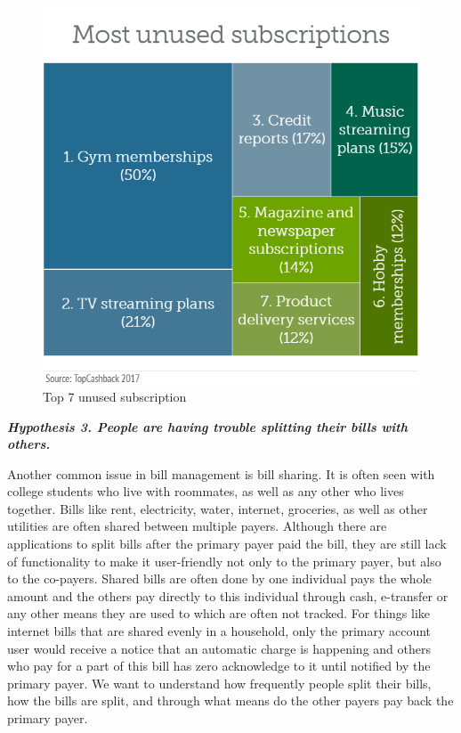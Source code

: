 \documentclass{sigchi}
\begin{document}
\begin{figure}[h!]
\centering
  \includegraphics[width=0.9\columnwidth]{unused-sub.png}
  \caption{Top 7 unused subscription }
  \label{fig:figure6}
\end{figure}

\textbf{\textit{Hypothesis 3. People are having trouble splitting their bills with others.}}

Another common issue in bill management is bill sharing. It is often seen with college students who live with roommates, as well as any other who lives together. Bills like rent, electricity, water, internet, groceries, as well as other utilities are often shared between multiple payers. Although there are applications to split bills after the primary payer paid the bill, they are still lack of functionality to make it user-friendly not only to the primary payer, but also to the co-payers. Shared bills are often done by one individual pays the whole amount and the others pay directly to this individual through cash, e-transfer or any other means they are used to which are often not tracked. For things like internet bills that are shared evenly in a household, only the primary account user would receive a notice that an automatic charge is happening and others who pay for a part of this bill has zero acknowledge to it until notified by the primary payer. We want to understand how frequently people split their bills, how the bills are split, and through what means do the other payers pay back the primary payer. 
\end{document}
